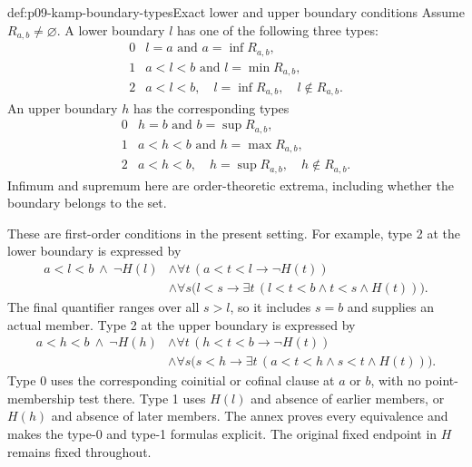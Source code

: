 \begin{hbdefinition}{def:p09-kamp-boundary-types}{Exact lower and upper boundary conditions}
Assume \(R_{a,b}\ne\varnothing\). A lower boundary \(l\)
has one of the following three types:
\[
\begin{array}{c|l}
 0&l=a\text{ and }a=\inf R_{a,b},\\
 1&a<l<b\text{ and }l=\min R_{a,b},\\
 2&a<l<b,\quad l=\inf R_{a,b},\quad l\notin R_{a,b}.
\end{array}
\]
An upper boundary \(h\) has the corresponding types
\[
\begin{array}{c|l}
 0&h=b\text{ and }b=\sup R_{a,b},\\
 1&a<h<b\text{ and }h=\max R_{a,b},\\
 2&a<h<b,\quad h=\sup R_{a,b},\quad h\notin R_{a,b}.
\end{array}
\]
Infimum and supremum here are order-theoretic extrema, including
whether the boundary belongs to the set.

These are first-order conditions in the present setting. For example,
type 2 at the lower boundary is expressed by
\[
\begin{split}
 a<l<b\ \land\ \neg H(l)
 &\land\forall t\,(a<t<l\to\neg H(t))\\
 &\land\forall s\bigl(l<s\to
        \exists t\,(l<t<b\land t<s\land H(t))\bigr).
\end{split}
\]
The final quantifier ranges over all \(s>l\), so it includes
\(s=b\) and supplies an actual member. Type 2 at the upper
boundary is expressed by
\[
\begin{split}
 a<h<b\ \land\ \neg H(h)
 &\land\forall t\,(h<t<b\to\neg H(t))\\
 &\land\forall s\bigl(s<h\to
        \exists t\,(a<t<h\land s<t\land H(t))\bigr).
\end{split}
\]
Type 0 uses the corresponding coinitial or cofinal clause at \(a\)
or \(b\), with no point-membership test there. Type 1 uses
\(H(l)\) and absence of earlier members, or \(H(h)\) and
absence of later members. The annex proves every equivalence and makes
the type-0 and type-1 formulas explicit. The original fixed endpoint
in \(H\) remains fixed throughout.
\end{hbdefinition}

